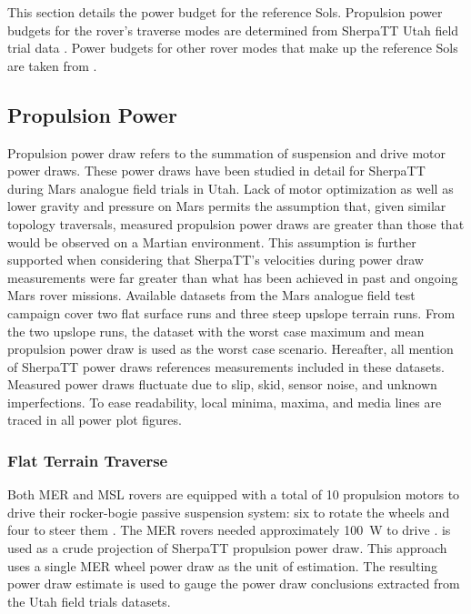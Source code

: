 This section details the power budget for the reference Sols. Propulsion power budgets for the rover's traverse modes are determined from SherpaTT Utah field trial data . Power budgets for other rover modes that make up the reference Sols are taken from .

\subsection{Propulsion Power}
\label{sec:PowerBudget:PropulsionPowerBudget}
Propulsion power draw refers to the summation of suspension and drive motor power draws. These power draws have been studied in detail for SherpaTT during Mars analogue field trials in Utah. Lack of motor optimization as well as lower gravity and pressure on Mars permits the assumption that, given similar topology traversals, measured propulsion power draws are greater than those that would be observed on a Martian environment. This assumption is further supported when considering that SherpaTT's velocities during power draw measurements were far greater than what has been achieved in past and ongoing Mars rover missions. Available datasets from the Mars analogue field test campaign cover two flat surface runs and three steep upslope terrain runs. From the two upslope runs, the dataset with the worst case maximum and mean propulsion power draw is used as the worst case scenario. Hereafter, all mention of SherpaTT power draws references measurements included in these datasets. Measured power draws fluctuate due to slip, skid, sensor noise, and unknown imperfections. To ease readability, local minima, maxima, and media lines are traced in all power plot figures.

\subsubsection{Flat Terrain Traverse}
\label{sec:PowerBudget:PropulsionPowerBudget:FlatTerrainTraverse}
Both \ac{MER} and \ac{MSL} rovers are equipped with a total of 10 propulsion motors to drive their rocker-bogie passive suspension system: six to rotate the wheels and four to steer them  . The \ac{MER} rovers needed approximately \SI{100}{\watt} to drive .  is used as a crude projection of SherpaTT propulsion power draw. This approach uses a single \ac{MER} wheel power draw as the unit of estimation. The resulting power draw estimate is used to gauge the power draw conclusions extracted from the Utah field trials datasets.

